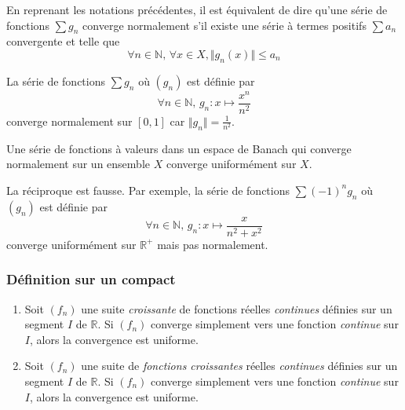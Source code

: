 	\begin{remark}
		En reprenant les notations précédentes, il est équivalent de dire qu'une série de fonctions $\sum g_n$ converge normalement s'il existe une série à termes positifs $\sum a_n$ convergente et telle que
		\[ \forall n \in \mathbb{N}, \, \forall x \in X, \Vert g_n(x) \Vert \leq a_n \]
	\end{remark}
	
	\begin{example}
		La série de fonctions $\sum g_n$ où $(g_n)$ est définie par
		\[ \forall n \in \mathbb{N}, \, g_n : x \mapsto \frac{x^n}{n^2} \]
		converge normalement sur $[0,1]$ car $\Vert g_n \Vert = \frac{1}{n^2}$.
	\end{example}
	
	\begin{theorem}
		Une série de fonctions à valeurs dans un espace de Banach qui converge normalement sur un ensemble $X$ converge uniformément sur $X$.
	\end{theorem}
	
	\begin{cexample}
		La réciproque est fausse. Par exemple, la série de fonctions $\sum (-1)^n g_n$ où $(g_n)$ est définie par
		\[ \forall n \in \mathbb{N}, \, g_n : x \mapsto \frac{x}{n^2 + x^2} \]
		converge uniformément sur $\mathbb{R}^+$ mais pas normalement.
	\end{cexample}
	
	\subsubsection{Définition sur un compact}
	
	
	\begin{theorem}
		\begin{enumerate}[label=(\roman*)]
			\item Soit $(f_n)$ une suite \textit{croissante} de fonctions réelles \textit{continues} définies sur un segment $I$ de $\mathbb{R}$. Si $(f_n)$ converge simplement vers une fonction \textit{continue} sur $I$, alors la convergence est uniforme.
			\item Soit $(f_n)$ une suite de \textit{fonctions croissantes} réelles \textit{continues} définies sur un segment $I$ de $\mathbb{R}$. Si $(f_n)$ converge simplement vers une fonction \textit{continue} sur $I$, alors la convergence est uniforme.
		\end{enumerate}
	\end{theorem}
	
